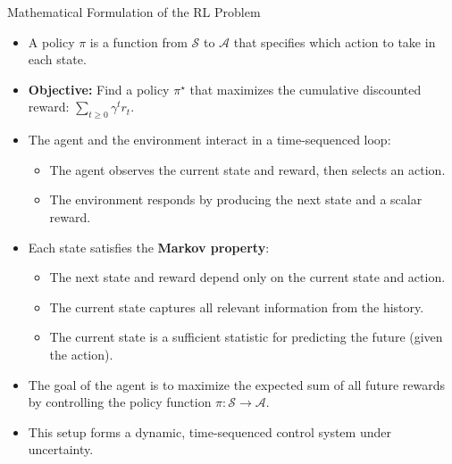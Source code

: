\begin{frame}[allowframebreaks]{Mathematical Formulation of the RL Problem}
\begin{itemize}
\begin{itemize}
            \item The environment samples reward $r_t \sim R(\cdot|s_t, a_t)$.
            \item The environment samples the next state $s_{t+1} \sim P(\cdot|s_t, a_t)$.
            \item The agent receives reward $r_t$ and next state $s_{t+1}$.
        \end{itemize}
        \item A policy $\pi$ is a function from $\mathcal{S}$ to $\mathcal{A}$ that specifies which action to take in each state.
        \item \textbf{Objective:} Find a policy $\pi^\star$ that maximizes the cumulative discounted reward: $\sum_{t \geq 0} \gamma^t r_t$.
    \end{itemize}
\framebreak
    \begin{itemize}
        \item The agent and the environment interact in a time-sequenced loop:
        \begin{itemize}
            \item The agent observes the current state and reward, then selects an action.
            \item The environment responds by producing the next state and a scalar reward.
        \end{itemize}
        \item Each state satisfies the \textbf{Markov property}:
        \begin{itemize}
            \item The next state and reward depend only on the current state and action.
            \item The current state captures all relevant information from the history.
            \item The current state is a sufficient statistic for predicting the future (given the action).
        \end{itemize}
        \item The goal of the agent is to maximize the expected sum of all future rewards by controlling the policy function $\pi: \mathcal{S} \rightarrow \mathcal{A}$.
        \item This setup forms a dynamic, time-sequenced control system under uncertainty.
    \end{itemize}
\end{frame}

